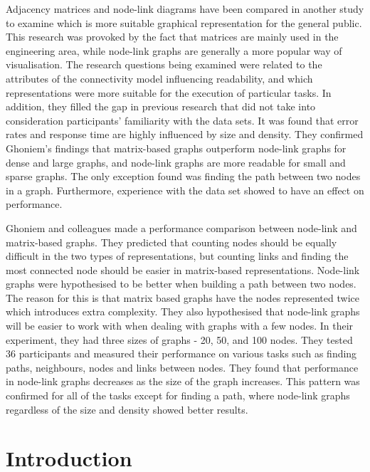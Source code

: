 \documentclass{l4proj}
\begin{document}
Adjacency matrices and node-link diagrams have been compared in another study \cite{keller2006matrices} to examine which is more suitable graphical representation for the general public. This research was provoked by the fact that matrices are mainly used in the engineering area, while node-link graphs are generally a more popular way of visualisation. The research questions being examined were related to the attributes of the connectivity model influencing readability, and which representations were more suitable for the execution of particular tasks. In addition, they filled the gap in previous research that did not take into consideration participants' familiarity with the data sets. It was found that error rates and response time are highly influenced by size and density. They confirmed Ghoniem's \cite{ghoniem2004comparison} findings that matrix-based graphs outperform node-link graphs for dense and large graphs, and node-link graphs are more readable for small and sparse graphs. The only exception found was finding the path between two nodes in a graph. Furthermore, experience with the data set showed to have an effect on performance. 

Ghoniem and colleagues \cite{ghoniem2004comparison} made a performance comparison between node-link and matrix-based graphs. They predicted that counting nodes should be equally difficult in the two types of representations, but counting links and finding the most connected node should be easier in matrix-based representations. Node-link graphs were hypothesised to be better when building a path between two nodes. The reason for this is that matrix based graphs have the nodes represented twice which introduces extra complexity. They also hypothesised that node-link graphs will be easier to work with when dealing with graphs with a few nodes. In their experiment, they had three sizes of graphs - 20, 50, and 100 nodes. They tested 36 participants and measured their performance on various tasks such as finding paths, neighbours, nodes and links between nodes. They found that performance in node-link graphs decreases as the size of the graph increases. This pattern was confirmed for all of the tasks except for finding a path, where node-link graphs regardless of the size and density showed better results.

\chapter{Introduction}
\end{document}
